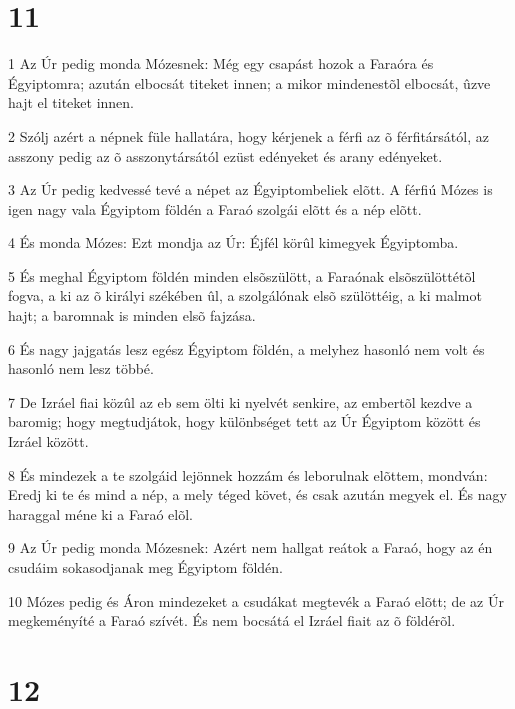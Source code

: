\chapter{11}

\par 1 Az Úr pedig monda Mózesnek: Még egy csapást hozok a Faraóra és Égyiptomra; azután elbocsát titeket innen; a mikor mindenestõl elbocsát, ûzve hajt el titeket innen.
\par 2 Szólj azért a népnek füle hallatára, hogy kérjenek a férfi az õ férfitársától, az asszony pedig az õ asszonytársától ezüst edényeket és arany edényeket.
\par 3 Az Úr pedig kedvessé tevé a népet az Égyiptombeliek elõtt. A férfiú Mózes is igen nagy vala Égyiptom földén a Faraó szolgái elõtt és a nép elõtt.
\par 4 És monda Mózes: Ezt mondja az Úr: Éjfél körûl kimegyek Égyiptomba.
\par 5 És meghal Égyiptom földén minden elsõszülött, a Faraónak elsõszülöttétõl fogva, a ki az õ királyi székében ûl, a szolgálónak elsõ szülöttéig, a ki malmot hajt; a baromnak is minden elsõ fajzása.
\par 6 És nagy jajgatás lesz egész Égyiptom földén, a melyhez hasonló nem volt és hasonló nem lesz többé.
\par 7 De Izráel fiai közûl az eb sem ölti ki nyelvét senkire, az embertõl kezdve a baromig; hogy megtudjátok, hogy különbséget tett az Úr Égyiptom között és Izráel között.
\par 8 És mindezek a te szolgáid lejönnek hozzám és leborulnak elõttem, mondván: Eredj ki te és mind a nép, a mely téged követ, és csak azután megyek el. És nagy haraggal méne ki a Faraó elõl.
\par 9 Az Úr pedig monda Mózesnek: Azért nem hallgat reátok a Faraó, hogy az én csudáim sokasodjanak meg Égyiptom földén.
\par 10 Mózes pedig és Áron mindezeket a csudákat megtevék a Faraó elõtt; de az Úr megkeményíté a Faraó szívét. És nem bocsátá el Izráel fiait az õ földérõl.

\chapter{12}

